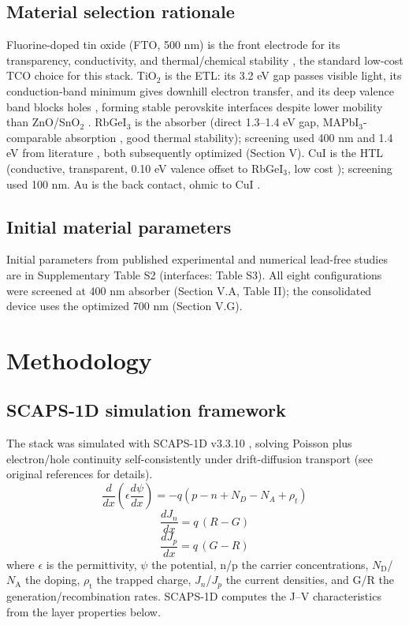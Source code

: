 \documentclass[review]{elsarticle}
\begin{document}
\subsection{Material selection rationale}
Fluorine-doped tin oxide (FTO, 500 nm) is the front electrode for its transparency, conductivity, and thermal/chemical stability \cite{r28}, the standard low-cost TCO choice for this stack.
TiO$_{2}$ is the ETL: its 3.2 eV gap passes visible light, its conduction-band minimum gives downhill electron transfer, and its deep valence band blocks holes \cite{r30,r31}, forming stable perovskite interfaces despite lower mobility than ZnO/SnO$_{2}$ \cite{r32}.
RbGeI$_{3}$ is the absorber (direct 1.3--1.4 eV gap, MAPbI$_{3}$-comparable absorption \cite{r17,r18}, good thermal stability); screening used 400 nm and 1.4 eV from literature \cite{r14}, both subsequently optimized (Section V).
CuI is the HTL (conductive, transparent, 0.10 eV valence offset to RbGeI$_{3}$, low cost \cite{r25,r26,r33}); screening used 100 nm. Au is the back contact, ohmic to CuI \cite{r34}. 

\subsection{Initial material parameters}
Initial parameters from published experimental and numerical lead-free studies \cite{r14,r15,r16,r19,r30} are in Supplementary Table S2 (interfaces: Table S3). All eight configurations were screened at 400 nm absorber (Section V.A, Table II); the consolidated device uses the optimized 700 nm (Section V.G).





\section{Methodology}

\subsection{SCAPS-1D simulation framework}
The stack was simulated with SCAPS-1D v3.3.10 \cite{r19,r20}, solving Poisson plus electron/hole continuity self-consistently under drift-diffusion transport (see original references for details).
\begin{equation}\label{eq:poisson}
\frac{d}{dx}\left(\epsilon\frac{d\psi}{dx}\right) =
-q\left(p-n+N_{D}-N_{A}+\rho_{t}\right)
\end{equation}
\begin{equation}\label{eq:electron}
\frac{dJ_{n}}{dx} = q\,(R-G)
\end{equation}
\begin{equation}\label{eq:hole}
\frac{dJ_{p}}{dx} = q\,(G-R)
\end{equation}
where $\epsilon$ is the permittivity, $\psi$ the potential, n/p the carrier concentrations, $N_{\mathrm{D}}$/$N_{\mathrm{A}}$ the doping, $\rho_{\mathrm{t}}$ the trapped charge, $J_{n}$/$J_{p}$ the current densities, and G/R the generation/recombination rates. SCAPS-1D computes the J--V characteristics from the layer properties below.
\end{document}
